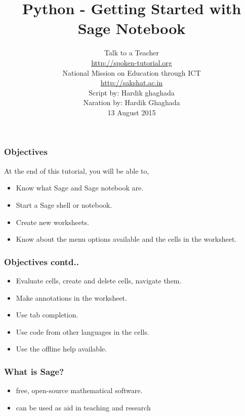 \documentclass[17pt,compress]{beamer}
\author[FOSSEE]{}
\institute[IIT Bombay]{}
\date[]{}
\begin{document}
\sffamily \bfseries
\title
[Getting Started with Sage Notebook]
{Python - Getting Started with Sage Notebook}
\author
[FOSSEE, IIT - Bombay]
{\small Talk to a Teacher\\{\color{blue}\url{http://spoken-tutorial.org}}\\National Mission on Education
 through ICT\\{\color{blue}\url{http://sakshat.ac.in}} \\[0.5cm]{\tiny Script by: Hardik ghaghada \\ Naration by: Hardik Ghaghada \\ 13 August 2015}}

\begin{frame}
   \titlepage
\end{frame}
\begin{frame}
\frametitle{Objectives}
\label{sec-2}

  At the end of this tutorial, you will be able to,\pause

\begin{itemize}
\item Know what Sage and Sage notebook are.\pause
\item Start a Sage shell or notebook.\pause
\item Create new worksheets.\pause
\item Know about the menu options available and the cells in the worksheet.
\end{itemize}
\end{frame}
\begin{frame}
\frametitle{Objectives contd..}
\label{sec-2}

\begin{itemize}
\item Evaluate cells, create and delete cells, navigate them.\pause
\item Make annotations in the worksheet.\pause
\item Use tab completion.\pause
\item Use code from other languages in the cells.\pause
\item Use the offline help available.
\end{itemize}
\end{frame}
\begin{frame}
\frametitle{What is Sage?}
\label{sec-3.1}


\begin{itemize}
\item free, open-source mathematical software.\pause
\item can be used as aid in teaching and research
\end{itemize}
\end{frame}
\end{document}
